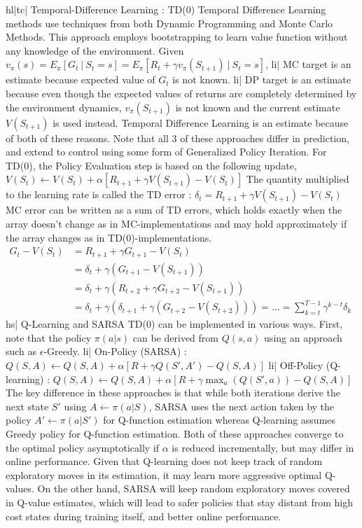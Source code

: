 hl|tc| Temporal-Difference Learning : TD(0)
Temporal Difference Learning methods use techniques from both Dynamic Programming and Monte Carlo Methods. This approach employs bootstrapping to learn value function without any knowledge of the environment.
Given \( v_\pi(s) = E_\pi[G_t \ | \ S_t = s] = E_\pi[R_t + \gamma v_\pi(S_{t+1}) \ | \ S_t = s] \),
li| MC target is an estimate because expected value of \( G_t \) is not known.
li| DP target is an estimate because even though the expected values of returns are completely determined by the environment dynamics, \( v_\pi(S_{t+1}) \) is not known and the current estimate \( V(S_{t+1}) \) is used instead.
Temporal Difference Learning is an estimate because of both of these reasons. Note that all 3 of these approaches differ in prediction, and extend to control using some form of Generalized Policy Iteration. For TD(0), the Policy Evaluation step is based on the following update,
\( V(S_t) \leftarrow V(S_t) + \alpha [R_{t+1} + \gamma V(S_{t+1}) - V(S_t)] \)
The quantity multiplied to the learning rate is called the TD error : \( \delta_t = R_{t+1} + \gamma V(S_{t+1}) - V(S_t) \)
MC error can be written as a sum of TD errors, which holds exactly when the array doesn't change as in MC-implementations and may hold approximately if the array changes as in TD(0)-implementations.
\( \begin{aligned} G_t - V(S_t) &= R_{t+1} + \gamma G_{t+1} - V(S_t) \\ &= \delta_t + \gamma(G_{t+1} - V(S_{t+1})) \\ &= \delta_t + \gamma(R_{t+2} + \gamma G_{t+2} - V(S_{t+1})) \\ &= \delta_t + \gamma(\delta_{t+1} + \gamma(G_{t+2} - V(S_{t+2}))) = \ldots = \sum_{k=t}^{T-1} \gamma^{k-t}\delta_{k} \end{aligned} \)
hs| Q-Learning and SARSA
TD(0) can be implemented in various ways. First, note that the policy \( \pi(a|s) \) can be derived from \( Q(s,a) \) using an approach such as \( \epsilon \)-Greedy.
li| On-Policy (SARSA) : \( Q(S, A) \leftarrow Q(S, A) + \alpha[R + \gamma Q(S', A') - Q(S, A)] \)
li| Off-Policy (Q-learning) : \( Q(S, A) \leftarrow Q(S, A) + \alpha[R + \gamma \max_a(Q(S', a)) - Q(S,A)] \)
The key difference in these approaches is that while both iterations derive the next state \( S' \) using \( A \leftarrow \pi(a|S) \), SARSA uses the next action taken by the policy \( A' \leftarrow \pi(a|S') \) for Q-function estimation whereas Q-learning assumes Greedy policy for Q-function estimation.
Both of these approaches converge to the optimal policy asymptotically if \( \alpha \) is reduced incrementally, but may differ in online performance. Given that Q-learning does not keep track of random exploratory moves in its estimation, it may learn more aggressive optimal Q-values. On the other hand, SARSA will keep random exploratory moves covered in Q-value estimates, which will lead to safer policies that stay distant from high cost states during training itself, and better online performance.
